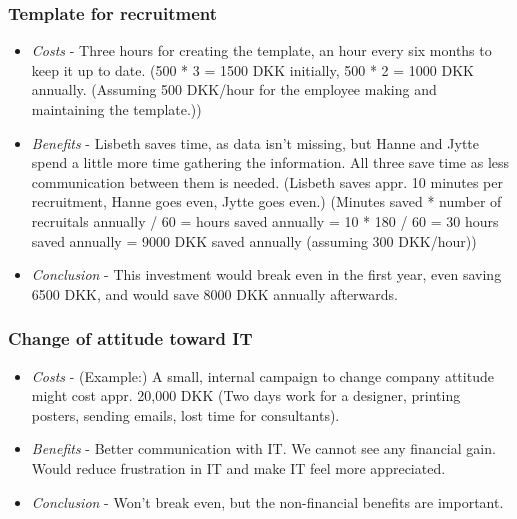 \subsubsection{Template for recruitment}
\begin{itemize}
\item \emph{Costs} - Three hours for creating the template, an hour every six months to keep it up to date. (500 * 3 = 1500 DKK initially, 500 * 2 = 1000 DKK annually. (Assuming 500 DKK/hour for the employee making and maintaining the template.))
\item \emph{Benefits} - Lisbeth saves time, as data isn't missing, but Hanne and Jytte spend a little more time gathering the information. All three save time as less communication between them is needed. (Lisbeth saves appr. 10 minutes per recruitment, Hanne goes even, Jytte goes even.) (Minutes saved * number of recruitals annually / 60 = hours saved annually = 10 * 180 / 60 = 30 hours saved annually = 9000 DKK saved annually (assuming 300 DKK/hour))
\item \emph{Conclusion} - This investment would break even in the first year, even saving 6500 DKK, and would save 8000 DKK annually afterwards.
\end{itemize}

\subsubsection{Change of attitude toward IT}
\begin{itemize}
\item \emph{Costs} - (Example:) A small, internal campaign to change company attitude might cost appr. 20,000 DKK (Two days work for a designer, printing posters, sending emails, lost time for consultants).
\item \emph{Benefits} - Better communication with IT. We cannot see any financial gain. Would reduce frustration in IT and make IT feel more appreciated.
\item \emph{Conclusion} - Won't break even, but the non-financial benefits are important.
\end{itemize}

